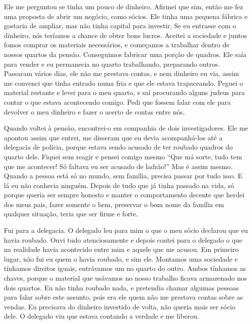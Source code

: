 Ele me perguntou se tinha um pouco de dinheiro. Afirmei que sim,
então me fez uma proposta de abrir um negócio, como sócios. Ele tinha uma
pequena fábrica e gostaria de ampliar, mas não tinha capital para
investir. Se eu entrasse com o dinheiro, nós teríamos a chance de obter
bons lucros. Aceitei a sociedade e juntos fomos comprar os materiais
necessários, e começamos a trabalhar dentro de nossos quartos da pensão.
Conseguimos fabricar uma porção de quadros. Ele saía para vender e eu
permanecia no quarto trabalhando, preparando outros. Passaram vários
dias, ele não me prestava contas, e nem dinheiro eu via, assim me
convenci que tinha entrado numa fria e que ele estava trapaceando. Peguei
o material restante e levei para o meu quarto, e saí procurando alguns
judeus para contar o que estava acontecendo comigo. Pedi que
fossem falar com ele para devolver o meu dinheiro e fazer o acerto de
contas entre nós.

Quando voltei à pensão, encontrei-o em companhia de dois investigadores. 
Ele me apontou assim que entrei, me disseram que eu devia
acompanhá-los até a delegacia de polícia, porque estava sendo acusado de
ter roubado quadros do quarto dele. Fiquei sem reagir e pensei comigo
mesmo ``Que má sorte, tudo tem que me acontecer! Só faltava eu ser
acusado de ladrão!'' Mas é assim mesmo. Quando a pessoa está só no
mundo, sem família, precisa passar por tudo isso. E lá eu não conhecia
ninguém. Depois de tudo que já tinha passado na vida, só porque queria
ser sempre honesto e manter o comportamento decente que herdei dos meus
pais, fazer somente o bem, preservar o bom nome da família em
qualquer situação, teria que ser firme e forte.

Fui para a delegacia. O delegado leu para mim o que o meu sócio
declarou que eu havia roubado. Ouvi tudo atenciosamente e depois contei
para o delegado o que na realidade havia acontecido entre mim e aquele
que me acusou. Em primeiro lugar, não fui eu quem o havia
roubado, e sim ele. Montamos uma sociedade e tínhamos direitos iguais, 
entrávamos um no quarto do outro. Ambos tínhamos
as chaves, porque o material que usávamos no nosso trabalho
ficava armazenado nos dois quartos. Eu não tinha roubado nada, e pretendia
chamar algumas pessoas para falar sobre este assunto, pois era ele quem não
me prestava contas sobre as vendas. Eu precisava do dinheiro investido de volta, não queria
mais ser sócio dele. O delegado viu que estava contando a verdade e me
liberou.

